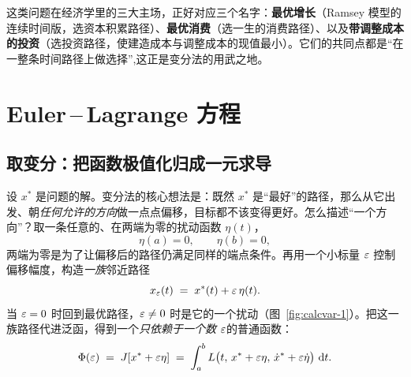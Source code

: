 
这类问题在经济学里的三大主场，正好对应三个名字：\textbf{最优增长}（Ramsey 模型的连续时间版，选资本积累路径）、\textbf{最优消费}（选一生的消费路径）、以及\textbf{带调整成本的投资}（选投资路径，使建造成本与调整成本的现值最小）。它们的共同点都是``在一整条时间路径上做选择'',这正是变分法的用武之地。

\section{Euler\,–\,Lagrange 方程}
\label{sec:calcvar-2}

\subsection{取变分：把函数极值化归成一元求导}

设 $x^*$ 是问题的解。变分法的核心想法是：既然 $x^*$ 是``最好''的路径，那么从它出发、朝\emph{任何允许的方向}做一点点偏移，目标都不该变得更好。怎么描述``一个方向''？取一条任意的、在两端为零的扰动函数 $\eta(t)$，
\[
    \eta(a)=0,\qquad \eta(b)=0 ,
\]
两端为零是为了让偏移后的路径仍满足同样的端点条件。再用一个小标量 $\varepsilon$ 控制偏移幅度，构造\emph{一族}邻近路径
\[
    x_\varepsilon(t)\;=\;x^*(t)+\varepsilon\,\eta(t) .
\]
当 $\varepsilon=0$ 时回到最优路径，$\varepsilon\neq0$ 时是它的一个扰动（图~\ref{fig:calcvar-1}）。把这一族路径代进泛函，得到一个\emph{只依赖于一个数 $\varepsilon$}的普通函数：
\[
    \Phi(\varepsilon)\;=\;J[x^*+\varepsilon\eta]\;=\;\int_a^b L\bigl(t,\,x^*+\varepsilon\eta,\,\dot x^*+\varepsilon\dot\eta\bigr)\,\mathop{}\!\mathrm{d} t .
\]


